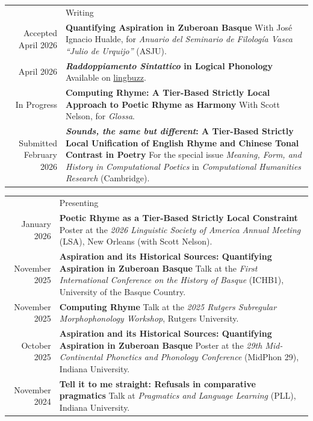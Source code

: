 \documentclass[letterpaper, 11pt]{article}
\newcommand{\headingfont}{\Large\color{accentcolor}}
\newenvironment{SectionTable}[1]{
	\setlength{\LTpre}{0pt}
	\setlength{\LTpost}{0pt}
	\renewcommand*{\arraystretch}{1.4}
	\setlength{\tabcolsep}{10pt}
	\begin{longtable}{Rp{5.9in}} & #1 \\}
{\end{longtable}\vspace{0.25cm}}
\begin{document}
\begin{SectionTable}{\headingfont Writing}
 Accepted April 2026 &
	\textbf{Quantifying Aspiration in Zuberoan Basque} \newline
	With José Ignacio Hualde, for \textit{Anuario del Seminario de Filología Vasca ``Julio de Urquijo''} (ASJU). \\
	
	April 2026 &
	\textbf{\textit{Raddoppiamento Sintattico} in Logical Phonology} \newline
	Available on \href{https://ling.auf.net/lingbuzz/009911}{lingbuzz}. \\

	In Progress &
	\textbf{Computing Rhyme: A Tier-Based Strictly Local Approach to Poetic Rhyme as Harmony} \newline
	With Scott Nelson, for \textit{Glossa}. \\

	Submitted February 2026 &
	\textbf{\textit{Sounds, the same but different}: A Tier-Based Strictly Local Unification of English Rhyme and Chinese Tonal Contrast in Poetry} \newline
 For the special issue \textit{Meaning, Form, and History in Computational Poetics} in \textit{Computational Humanities Research} (Cambridge). \\
\end{SectionTable}


\begin{SectionTable}{\headingfont Presenting}
	January 2026 &
	\textbf{Poetic Rhyme as a Tier-Based Strictly Local Constraint} \newline
	Poster at the \textit{2026 Linguistic Society of America Annual Meeting} (LSA), New Orleans (with Scott Nelson). \\

	November 2025 &
	\textbf{Aspiration and its Historical Sources: Quantifying Aspiration in Zuberoan Basque} \newline
	Talk at the \textit{First International Conference on the History of Basque} (ICHB1), University of the Basque Country. \\

	November 2025 &
	\textbf{Computing Rhyme} \newline
	Talk at the \textit{2025 Rutgers Subregular Morphophonology Workshop}, Rutgers University. \\

	October 2025 &
	\textbf{Aspiration and its Historical Sources: Quantifying Aspiration in Zuberoan Basque} \newline
	Poster at the \textit{29th Mid-Continental Phonetics and Phonology Conference} (MidPhon 29), Indiana University. \\

	November 2024 &
	\textbf{Tell it to me straight: Refusals in comparative pragmatics} \newline
	Talk at \textit{Pragmatics and Language Learning} (PLL), Indiana University.
\end{SectionTable}
\end{document}
